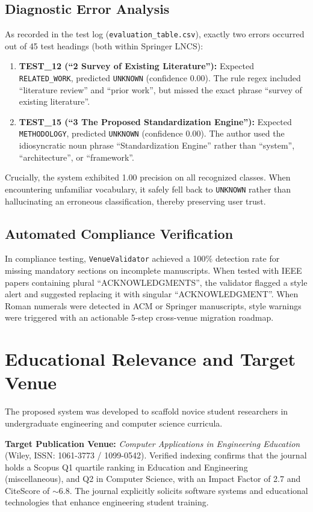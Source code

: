 \documentclass[conference]{IEEEtran}
\begin{document}
\subsection{Diagnostic Error Analysis}
As recorded in the test log (\texttt{evaluation\_table.csv}), exactly two errors occurred out of 45 test headings (both within Springer LNCS):
\begin{enumerate}
    \item \textbf{TEST\_12 (``2 Survey of Existing Literature''):} Expected \texttt{RELATED\_WORK}, predicted \texttt{UNKNOWN} (confidence 0.00). The rule regex included ``literature review'' and ``prior work'', but missed the exact phrase ``survey of existing literature''.
    \item \textbf{TEST\_15 (``3 The Proposed Standardization Engine''):} Expected \texttt{METHODOLOGY}, predicted \texttt{UNKNOWN} (confidence 0.00). The author used the idiosyncratic noun phrase ``Standardization Engine'' rather than ``system'', ``architecture'', or ``framework''.
\end{enumerate}

Crucially, the system exhibited 1.00 precision on all recognized classes. When encountering unfamiliar vocabulary, it safely fell back to \texttt{UNKNOWN} rather than hallucinating an erroneous classification, thereby preserving user trust.

\subsection{Automated Compliance Verification}
In compliance testing, \texttt{VenueValidator} achieved a 100\% detection rate for missing mandatory sections on incomplete manuscripts. When tested with IEEE papers containing plural ``ACKNOWLEDGMENTS'', the validator flagged a style alert and suggested replacing it with singular ``ACKNOWLEDGMENT''. When Roman numerals were detected in ACM or Springer manuscripts, style warnings were triggered with an actionable 5-step cross-venue migration roadmap.

\section{Educational Relevance and Target Venue}
The proposed system was developed to scaffold novice student researchers in undergraduate engineering and computer science curricula. 

\textbf{Target Publication Venue:} \textit{Computer Applications in Engineering Education} (Wiley, ISSN: 1061-3773 / 1099-0542). Verified indexing confirms that the journal holds a Scopus Q1 quartile ranking in Education and Engineering (miscellaneous), and Q2 in Computer Science, with an Impact Factor of 2.7 and CiteScore of $\sim$6.8. The journal explicitly solicits software systems and educational technologies that enhance engineering student training. 
\end{document}
